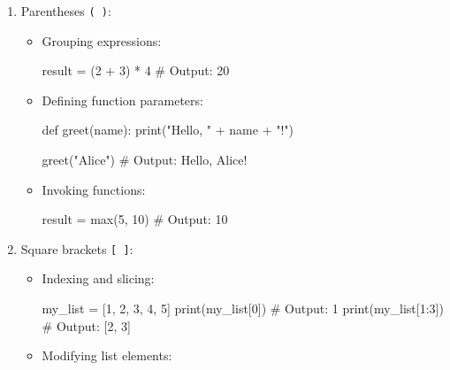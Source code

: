 \documentclass[
  letterpaper,
  DIV=11,
  numbers=noendperiod]{scrreprt}
\newenvironment{Shaded}{\begin{snugshade}}{\end{snugshade}}
\newcommand{\BuiltInTok}[1]{\textcolor[rgb]{0.00,0.23,0.31}{#1}}
\newcommand{\CommentTok}[1]{\textcolor[rgb]{0.37,0.37,0.37}{#1}}
\newcommand{\DecValTok}[1]{\textcolor[rgb]{0.68,0.00,0.00}{#1}}
\newcommand{\KeywordTok}[1]{\textcolor[rgb]{0.00,0.23,0.31}{#1}}
\newcommand{\NormalTok}[1]{\textcolor[rgb]{0.00,0.23,0.31}{#1}}
\newcommand{\OperatorTok}[1]{\textcolor[rgb]{0.37,0.37,0.37}{#1}}
\newcommand{\StringTok}[1]{\textcolor[rgb]{0.13,0.47,0.30}{#1}}
\providecommand{\tightlist}{%
  \setlength{\itemsep}{0pt}\setlength{\parskip}{0pt}}\usepackage{longtable,booktabs,array}
\begin{document}
\begin{enumerate}
\def\labelenumi{\arabic{enumi}.}
\tightlist
\item
  Parentheses \texttt{(\ )}:

  \begin{itemize}
  \item
    Grouping expressions:

\begin{Shaded}
\begin{Highlighting}[]
\NormalTok{result }\OperatorTok{=}\NormalTok{ (}\DecValTok{2} \OperatorTok{+} \DecValTok{3}\NormalTok{) }\OperatorTok{*} \DecValTok{4}  
\CommentTok{\# Output: 20}
\end{Highlighting}
\end{Shaded}
  \item
    Defining function parameters:

\begin{Shaded}
\begin{Highlighting}[]
\KeywordTok{def}\NormalTok{ greet(name):}
    \BuiltInTok{print}\NormalTok{(}\StringTok{"Hello, "} \OperatorTok{+}\NormalTok{ name }\OperatorTok{+} \StringTok{"!"}\NormalTok{)}

\NormalTok{greet(}\StringTok{"Alice"}\NormalTok{)  }
\CommentTok{\# Output: Hello, Alice!}
\end{Highlighting}
\end{Shaded}
  \item
    Invoking functions:

\begin{Shaded}
\begin{Highlighting}[]
\NormalTok{result }\OperatorTok{=} \BuiltInTok{max}\NormalTok{(}\DecValTok{5}\NormalTok{, }\DecValTok{10}\NormalTok{)  }
\CommentTok{\# Output: 10}
\end{Highlighting}
\end{Shaded}
  \end{itemize}
\item
  Square brackets \texttt{{[}\ {]}}:

  \begin{itemize}
  \item
    Indexing and slicing:

\begin{Shaded}
\begin{Highlighting}[]
\NormalTok{my\_list }\OperatorTok{=}\NormalTok{ [}\DecValTok{1}\NormalTok{, }\DecValTok{2}\NormalTok{, }\DecValTok{3}\NormalTok{, }\DecValTok{4}\NormalTok{, }\DecValTok{5}\NormalTok{]}
\BuiltInTok{print}\NormalTok{(my\_list[}\DecValTok{0}\NormalTok{])      }
\CommentTok{\# Output: 1}
\BuiltInTok{print}\NormalTok{(my\_list[}\DecValTok{1}\NormalTok{:}\DecValTok{3}\NormalTok{])    }
\CommentTok{\# Output: [2, 3]}
\end{Highlighting}
\end{Shaded}
  \item
    Modifying list elements:


\end{itemize}
\end{enumerate}
\end{document}

